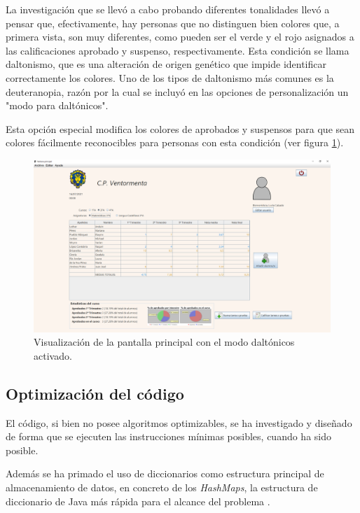 La investigación que se llevó a cabo probando diferentes tonalidades  llevó a pensar que, efectivamente, hay personas que no distinguen bien colores que, a primera vista, son muy diferentes, como pueden ser el verde y el rojo asignados a las calificaciones aprobado y suspenso, respectivamente. Esta condición se llama daltonismo, que es una alteración de origen genético que impide identificar correctamente los colores. Uno de los tipos de daltonismo más comunes es la deuteranopia, razón por la cual se incluyó en las opciones de personalización un "modo para daltónicos".

Esta opción especial modifica los colores de aprobados y suspensos para que sean colores fácilmente reconocibles para personas con esta condición (ver figura \ref{Fig:appdaltonicos}).

\begin{figure}[h]
\centering\includegraphics[width=1\linewidth]{figs/appdaltonicos.png}
\caption{Visualización de la pantalla principal con el modo daltónicos activado.}
\label{Fig:appdaltonicos}
\end{figure}

\subsection{Optimización del código}
\label{sub:optimizarcodigo}
El código, si bien no posee algoritmos optimizables, se ha investigado y diseñado de forma que se ejecuten las instrucciones mínimas posibles, cuando ha sido posible.

Además se ha primado el uso de diccionarios como estructura principal de almacenamiento de datos, en concreto de los \textit{HashMaps}, la estructura de diccionario de Java más rápida para el alcance del problema \cite{hashmap}.

